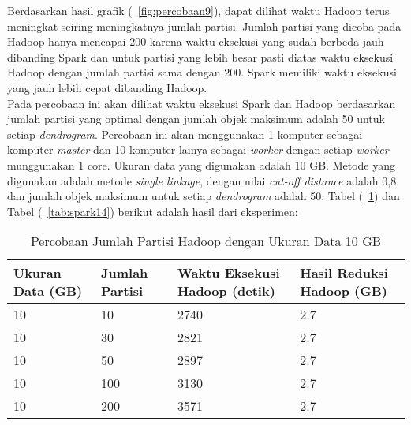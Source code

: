 Berdasarkan hasil grafik (~\ref{fig:percobaan9}), dapat dilihat waktu Hadoop terus meningkat seiring meningkatnya jumlah partisi. Jumlah partisi yang dicoba pada Hadoop hanya mencapai 200 karena waktu eksekusi yang sudah berbeda jauh dibanding Spark dan untuk partisi yang lebih besar pasti diatas waktu eksekusi Hadoop dengan jumlah partisi sama dengan 200. Spark memiliki waktu eksekusi yang jauh lebih cepat dibanding Hadoop.\\  



Pada percobaan ini akan dilihat waktu eksekusi Spark dan Hadoop berdasarkan jumlah partisi yang optimal dengan jumlah objek maksimum adalah 50 untuk setiap \textit{dendrogram}. Percobaan ini akan menggunakan 1 komputer sebagai komputer \textit{master} dan 10 komputer lainya sebagai \textit{worker} dengan setiap \textit{worker} munggunakan 1 core. Ukuran data yang digunakan adalah 10 GB. Metode yang digunakan adalah metode \textit{single linkage}, dengan nilai \textit{cut-off distance} adalah 0,8 dan jumlah objek maksimum untuk setiap \textit{dendrogram} adalah 50. Tabel (~\ref{tab:spark13}) dan Tabel (~\ref{tab:spark14}) berikut adalah hasil dari eksperimen:





\begin{table}[H] 
	\centering 
	\caption{Percobaan Jumlah Partisi Hadoop dengan Ukuran Data 10 GB}
	\label{tab:spark13}
	\begin{tabular}{|p{3cm}|p{3cm}|p{4cm}|p{4cm}|}
\hline
Ukuran Data (GB) & Jumlah Partisi &  Waktu Eksekusi Hadoop (detik) & Hasil Reduksi Hadoop (GB)\\
\hline
10 & 10 & 2740  & 2.7  \\
\hline
10 & 30 & 2821  & 2.7  \\
\hline
10 & 50 & 2897 & 2.7   \\
\hline
10 & 100 & 3130 & 2.7   \\
\hline
10 & 200 & 3571 & 2.7   \\
\hline


\hline

	\end{tabular} 
\end{table}




